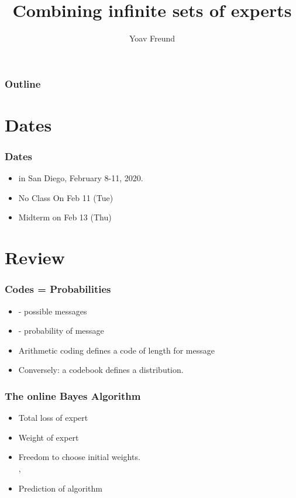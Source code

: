 \documentclass{beamer}
\title[Infinite sets of experts]%
{Combining infinite sets of experts}
\author[Freund] %
{Yoav Freund}
\institute[Universities of Somewhere and Elsewhere] %
\begin{document}

\begin{frame}
  \titlepage
\end{frame}

\begin{frame}
  \frametitle{Outline}
  \tableofcontents[pausesections]
\end{frame}

\section{Dates}

\begin{frame}
  \frametitle{Dates}
  \begin{itemize}
  \item {} in San Diego, February
    8-11, 2020.
  \item No Class On Feb 11 (Tue)
  \item Midterm on Feb 13 (Thu)
  \end{itemize}
\end{frame}

\section{Review}

\begin{frame}
  \frametitle{Codes = Probabilities}
  \begin{itemize}
  \item {} - possible messages
  \item {} - probability of message 
  \item Arithmetic coding defines a code of length  for message 
  \item Conversely: a codebook defines a distribution.
    \end{itemize}
\end{frame}

\begin{frame}
\frametitle{The online Bayes Algorithm}
\begin{itemize}
\item {\color{blue} Total loss} of expert 
\item {\color{blue}Weight} of expert 
\item
Freedom to choose initial weights.\\
 , 
\item {\color{blue}Prediction} of algorithm 
\R{\[
\vp_A^t = \frac{\sum_{i=1}^N \wt{t}{i} \vp_i^t}{\sum_{i=1}^N \wt{t}{i}}
\]}
\end{itemize}
\end{frame}
\end{document}
